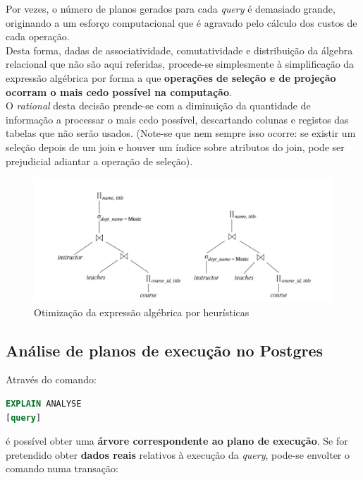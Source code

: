 \documentclass[oneside]{book}
\theoremstyle{definition}
\begin{document}
Por vezes, o número de planos gerados para cada \textit{query} é demasiado grande, originando a um esforço computacional que é agravado pelo cálculo dos custos de cada operação.\\
Desta forma, dadas de associatividade, comutatividade e distribuição da álgebra relacional que não são aqui referidas, procede-se simplesmente à simplificação da expressão algébrica por forma a que \textbf{operações de seleção e de projeção ocorram o mais cedo possível na computação}. \\
O \textit{rational} desta decisão prende-se com a diminuição da quantidade de informação a processar o mais cedo possível, descartando colunas e registos das tabelas que não serão usados. (Note-se que nem sempre isso ocorre: se existir um seleção depois de um join e houver um índice sobre atributos do join, pode ser prejudicial adiantar a operação de seleção).

\begin{figure}[H]
    \centering
    \includegraphics[scale = 0.8]{cap_indices/otimizacao_expr.png}
    \caption{Otimização da expressão algébrica por heurísticas}
\end{figure}
\vspace{-0.5em}
\subsection{Análise de planos de execução no Postgres}

Através do comando:
\begin{lstlisting}[language=SQL, morekeywords={CALL, DECLARE, PROCEDURE, IF, EXPLAIN, ANALYSE}, framesep=8pt, xleftmargin=40pt, framexleftmargin=40pt, frame=tb, framerule=0pt]
EXPLAIN ANALYSE 
[query]
\end{lstlisting}

é possível obter uma \textbf{árvore correspondente ao plano de execução}. Se for pretendido obter \textbf{dados reais} relativos à execução da \textit{query}, pode-se envolter o comando numa transação:
\end{document}
